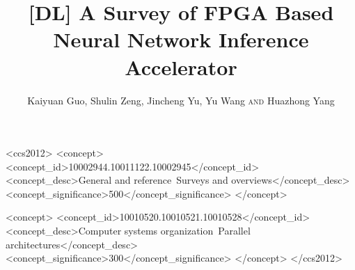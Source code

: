 \documentclass[acmsmall]{acmart}
\begin{document}
\title{[DL] A Survey of FPGA Based Neural Network Inference Accelerator} 

\author{Kaiyuan Guo, Shulin Zeng, Jincheng Yu, Yu Wang {\scshape and} Huazhong Yang}



%
%



\begin{CCSXML}  
  <ccs2012>  
  <concept>  
  <concept_id>10002944.10011122.10002945</concept_id>
   <concept_desc>General and reference~Surveys and overviews</concept_desc>  
  <concept_significance>500</concept_significance>
  </concept>
  
  <concept>  
  <concept_id>10010520.10010521.10010528</concept_id>
   <concept_desc>Computer systems organization~Parallel architectures</concept_desc> 
  <concept_significance>300</concept_significance>
  </concept>
  </ccs2012>  
\end{CCSXML}  
  
%
%



\end{document}
